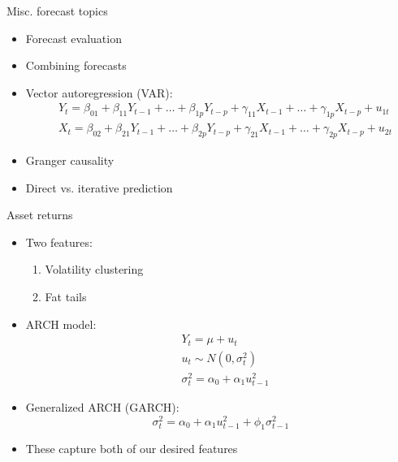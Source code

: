 \documentclass[aspectratio=169]{beamer}
\begin{document}
\begin{frame}{Misc. forecast topics}
    \begin{itemize}
        \item Forecast evaluation
        \item Combining forecasts
        \item Vector autoregression (VAR):
        $$
        \begin{aligned}
            & Y_t=\beta_{01}+\beta_{11} Y_{t-1}+\ldots+\beta_{1 p} Y_{t-p}+\gamma_{11} X_{t-1}+\ldots+\gamma_{1 p} X_{t-p}+u_{1 t} \\
            & X_t=\beta_{02}+\beta_{21} Y_{t-1}+\ldots+\beta_{2 p} Y_{t-p}+\gamma_{21} X_{t-1}+\ldots+\gamma_{2 p} X_{t-p}+u_{2 t}
            \end{aligned}
        $$
        \item Granger causality
        \item Direct vs. iterative prediction
    \end{itemize}
\end{frame}


\begin{frame}{Asset returns}
    \begin{itemize}
        \item Two features:
        \begin{enumerate}
            \item Volatility clustering
            \item Fat tails
        \end{enumerate}
        \item ARCH model:
        $$
        \begin{aligned}
            & Y_t=\mu+u_t \\
            & u_t \sim N\left(0, \sigma_t^2\right) \\
            & \sigma_t^2=\alpha_0+\alpha_1 u_{t-1}^2
            \end{aligned}
        $$
        \item Generalized ARCH (GARCH):
        $$
        \sigma_t^2=\alpha_0+\alpha_1 u_{t-1}^2+\phi_1 \sigma_{t-1}^2
        $$
        \item These capture both of our desired features
    \end{itemize}
\end{frame}
\end{document}

